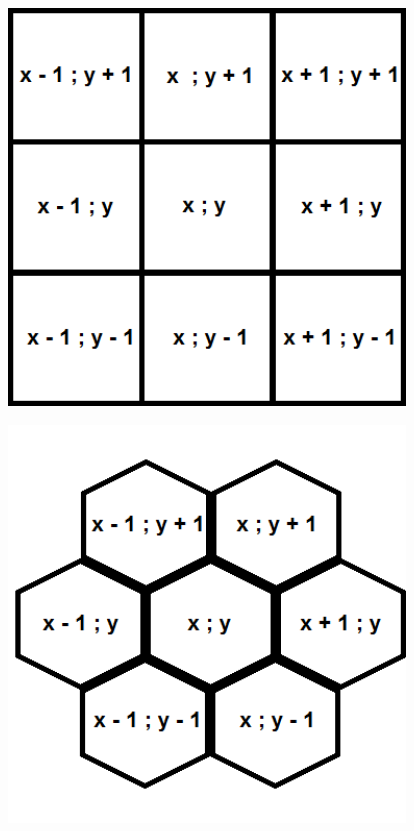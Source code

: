\documentclass{article}
\newenvironment{Figure}
  {\par\medskip\noindent\minipage{\linewidth}}
  {\endminipage\par\medskip}
\begin{document}
\begin{multicols}{2}
\begin{Figure}
 \centering
 \includegraphics[width=0.79\textwidth]{imgs/cartesian.png}
\label{fig:cartesianstd}
\end{Figure}
\begin{Figure}
 \centering
 \includegraphics[width=0.79\textwidth]{imgs/hexagonal.png}
\label{fig:cartesianstd}
\end{Figure}
\begin{Figure}
 \centering

\end{Figure}
\end{multicols}
\end{document}
